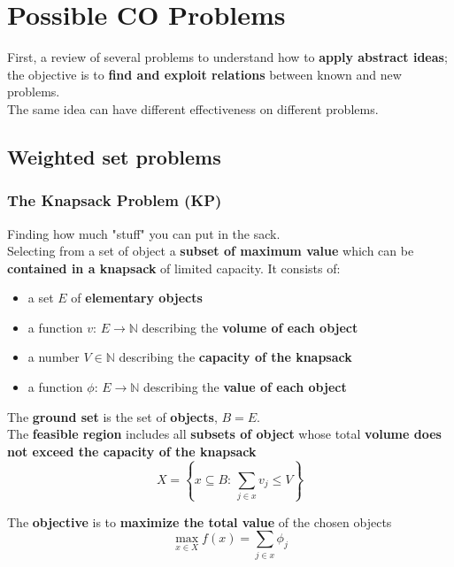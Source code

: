 \section{Possible CO Problems}
First, a review of several problems to understand how to \textbf{apply abstract ideas}; the objective is to \textbf{find and exploit relations} between known and new problems.\\
The same idea can have different effectiveness on different problems.\\

\subsection{Weighted set problems}
\subsubsection{The Knapsack Problem (KP)}
Finding how much "stuff" you can put in the sack.\\ 
Selecting from a set of object a \textbf{subset of maximum value} which can be \textbf{contained in a knapsack} of limited capacity. It consists of: 
\begin{itemize}
	\item a set $E$ of \textbf{elementary objects}
	\item a function $v: \, E \rightarrow \mathbb{N}$ describing the \textbf{volume of each object}
	\item a number $V \in \mathbb{N}$ describing the \textbf{capacity of the knapsack}
	\item a function $\phi : \, E \rightarrow \mathbb{N}$ describing the \textbf{value of each object}
\end{itemize}

The \textbf{ground set} is the set of \textbf{objects}, $B = E$.\\

The \textbf{feasible region} includes all \textbf{subsets of object} whose total \textbf{volume does not exceed the capacity of the knapsack}
$$ X = \left\{x \subseteq B : \, \sum_{j \in x} v_j \leq V \right\} $$

The \textbf{objective} is to \textbf{maximize the total value} of the chosen objects
$$ \max_{x \in X} f(x) = \sum_{j \in x} \phi_j $$

\newpage

